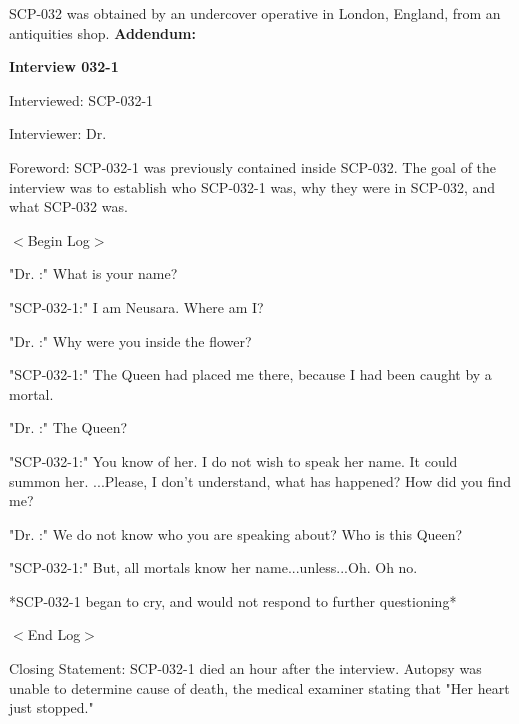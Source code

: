 SCP-032 was obtained by an undercover operative in London, England, from an antiquities shop.
\newpage
\textbf{Addendum:}

\textbf{Interview 032-1}

Interviewed: SCP-032-1

Interviewer: Dr. 

Foreword: SCP-032-1 was previously contained inside SCP-032. The goal of the interview was to establish who SCP-032-1 was, why they were in SCP-032, and what SCP-032 was.

$<$Begin Log$>$

"Dr. :" What is your name?

"SCP-032-1:" I am Neusara. Where am I?

"Dr. :" Why were you inside the flower?

"SCP-032-1:" The Queen had placed me there, because I had been caught by a mortal.

"Dr. :" The Queen?

"SCP-032-1:" You know of her. I do not wish to speak her name. It could summon her. ...Please, I don't understand, what has happened? How did you find me?

"Dr. :" We do not know who you are speaking about? Who is this Queen?

"SCP-032-1:" But, all mortals know her name...unless...Oh. Oh no.

*SCP-032-1 began to cry, and would not respond to further questioning*

$<$End Log$>$

Closing Statement: SCP-032-1 died an hour after the interview. Autopsy was unable to determine cause of death, the medical examiner stating that "Her heart just stopped."
